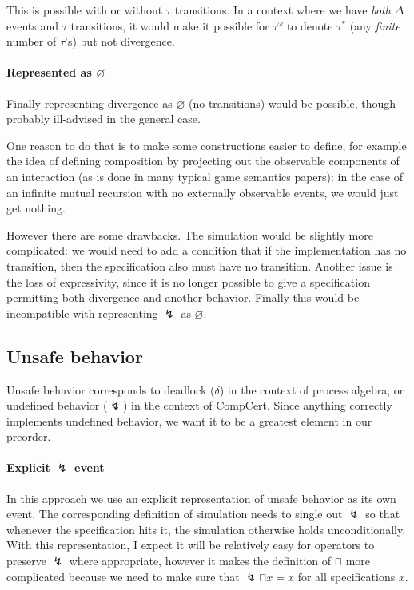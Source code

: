\documentclass[11pt]{article}
\begin{document}
This is possible with or without $\tau$ transitions.
In a context where we have \emph{both} $\Delta$ events and $\tau$ transitions,
it would make it possible for $\tau^\omega$ to denote $\tau^*$
(any \emph{finite} number of $\tau$'s)
but not divergence.

\paragraph{Represented as $\varnothing$}

Finally representing divergence as $\varnothing$ (no transitions)
would be possible, though probably ill-advised in the general case.

One reason to do that is
to make some constructions easier to define,
for example the idea of defining composition
by projecting out the observable components of an interaction
(as is done in many typical game semantics papers):
in the case of an infinite mutual recursion with no
externally observable events,
we would just get nothing.

However there are some drawbacks.
The simulation would be slightly more complicated:
we would need to add a condition that
if the implementation has no transition,
then the specification also must have no transition.
Another issue is the loss of expressivity,
since it is no longer possible to give a specification
permitting both divergence and another behavior.
Finally this would be incompatible with
representing $\lightning$ as $\varnothing$.


\subsection{Unsafe behavior} %

Unsafe behavior
corresponds to deadlock ($\delta$) in the context of process algebra,
or undefined behavior ($\lightning$) in the context of CompCert.
Since anything correctly implements undefined behavior,
we want it to be a greatest element in our preorder.

\paragraph{Explicit $\lightning$ event}

In this approach we use an explicit representation of
unsafe behavior as its own event.
The corresponding definition of simulation needs to single out $\lightning$
so that whenever the specification hits it,
the simulation otherwise holds unconditionally.
With this representation,
I expect it will be relatively easy
for operators to preserve $\lightning$ where appropriate,
however it makes the definition of $\sqcap$
more complicated because we need to make sure that
$\lightning \sqcap x = x$ for all specifications $x$.
\end{document}
